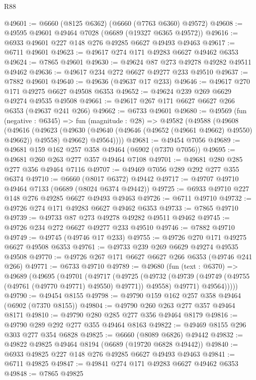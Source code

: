 \begin{lexlean}{R88}
\begin{coremodule}
@49601 := @6660 (@8125 @6362) (@6660 (@7763 @6360) @49572)
@49608 := @49595 @49601 @49464 @7028 (@6689 (@19327 @6365 @49572))
@49616 := @6933 @49601 @227 @148 @276 @49285 @6627 @49493 @49463
@49617 := @6711 @49601
@49623 := @49617 @274 @171 @49283 @6627 @49462 @6353
@49624 := @7865 @49601
@49630 := @49624 @87 @273 @49278 @49282 @49511 @49462
@49636 := @49617 @234 @272 @6627 @49277 @233 @49510
@49637 := @7882 @49601
@49640 := @49636 (@49637 @17 @233)
@49646 := @49617 @270 @171 @49275 @6627 @49508 @6353
@49652 := @49624 @239 @269 @6629 @49274 @49535 @49508
@49661 := @49617 @267 @171 @6627 @6627 @266 @6353 (@49637 @241 @266)
@49662 := @6733 @49601
@49680 := @49569
    (fun (negative : @6345) =>
    fun (magnitude : @28) =>
    @49582
      (@49588
        (@49608
          (@49616
            (@49623 (@49630 (@49640 (@49646 (@49652 (@49661 @49662) @49550) @49662)) @49558) @49662)
            @49564))))
@49681 := @49454 @7056
@49689 := @49681 @159 @162 @257 @358 @49464 (@6902 (@7370 @7056))
@49695 := @49681 @260 @263 @277 @357 @49464 @7108
@49701 := @49681 @280 @285 @277 @356 @49464 @7116
@49707 := @49469 @7056 @289 @292 @277 @355 @6374
@49710 := @6660 (@8017 @6372) @49442
@49717 := @49707 @49710 @49464 @7133 (@6689 (@8024 @6374 @49442))
@49725 := @6933 @49710 @227 @148 @276 @49285 @6627 @49493 @49463
@49726 := @6711 @49710
@49732 := @49726 @274 @171 @49283 @6627 @49462 @6353
@49733 := @7865 @49710
@49739 := @49733 @87 @273 @49278 @49282 @49511 @49462
@49745 := @49726 @234 @272 @6627 @49277 @233 @49510
@49746 := @7882 @49710
@49749 := @49745 (@49746 @17 @233)
@49755 := @49726 @270 @171 @49275 @6627 @49508 @6353
@49761 := @49733 @239 @269 @6629 @49274 @49535 @49508
@49770 := @49726 @267 @171 @6627 @6627 @266 @6353 (@49746 @241 @266)
@49771 := @6733 @49710
@49789 := @49680
    (fun (text : @6370) =>
    @49689
      (@49695
        (@49701
          (@49717
            (@49725
              (@49732
                (@49739 (@49749 (@49755 (@49761 (@49770 @49771) @49550) @49771)) @49558)
                @49771)
              @49564)))))
@49790 := @49454 @8155
@49798 := @49790 @159 @162 @257 @358 @49464 (@6902 (@7370 @8155))
@49804 := @49790 @260 @263 @277 @357 @49464 @8171
@49810 := @49790 @280 @285 @277 @356 @49464 @8179
@49816 := @49790 @289 @292 @277 @355 @49464 @8163
@49822 := @49469 @8155 @296 @303 @277 @354 @6828
@49825 := @6660 (@8089 @6826) @49442
@49832 := @49822 @49825 @49464 @8194 (@6689 (@19720 @6828 @49442))
@49840 := @6933 @49825 @227 @148 @276 @49285 @6627 @49493 @49463
@49841 := @6711 @49825
@49847 := @49841 @274 @171 @49283 @6627 @49462 @6353
@49848 := @7865 @49825

\end{coremodule}
\end{lexlean}
